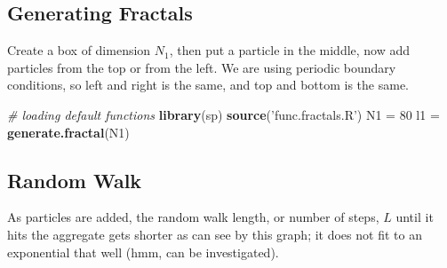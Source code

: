 \documentclass[]{article}
\newenvironment{Shaded}{\begin{snugshade}}{\end{snugshade}}
\newcommand{\CommentTok}[1]{\textcolor[rgb]{0.56,0.35,0.01}{\textit{#1}}}
\newcommand{\DataTypeTok}[1]{\textcolor[rgb]{0.13,0.29,0.53}{#1}}
\newcommand{\DecValTok}[1]{\textcolor[rgb]{0.00,0.00,0.81}{#1}}
\newcommand{\KeywordTok}[1]{\textcolor[rgb]{0.13,0.29,0.53}{\textbf{#1}}}
\newcommand{\NormalTok}[1]{#1}
\newcommand{\OperatorTok}[1]{\textcolor[rgb]{0.81,0.36,0.00}{\textbf{#1}}}
\newcommand{\StringTok}[1]{\textcolor[rgb]{0.31,0.60,0.02}{#1}}
\begin{document}
\hypertarget{generating-fractals}{%
\subsection{Generating Fractals}\label{generating-fractals}}

Create a box of dimension \(N_1\), then put a particle in the middle,
now add particles from the top or from the left. We are using periodic
boundary conditions, so left and right is the same, and top and bottom
is the same.

\begin{Shaded}
\begin{Highlighting}[]
\CommentTok{# loading default functions}
\KeywordTok{library}\NormalTok{(sp)}
\KeywordTok{source}\NormalTok{(}\StringTok{'func.fractals.R'}\NormalTok{) }
\NormalTok{N1 =}\StringTok{ }\DecValTok{80}
\NormalTok{l1 =}\StringTok{ }\KeywordTok{generate.fractal}\NormalTok{(N1)}
\end{Highlighting}
\end{Shaded}

\hypertarget{random-walk}{%
\subsection{Random Walk}\label{random-walk}}

As particles are added, the random walk length, or number of steps,
\(L\) until it hits the aggregate gets shorter as can see by this graph;
it does not fit to an exponential that well (hmm, can be investigated).

\begin{Shaded}
\end{Shaded}
\end{document}
